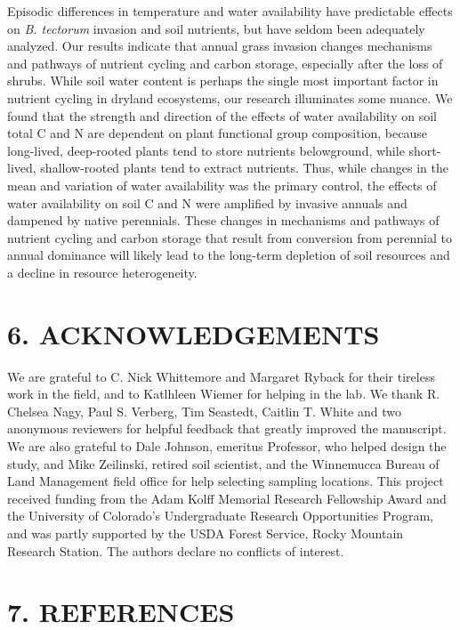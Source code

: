 \documentclass[
  11pt,
  a4paper,
]{article}
\begin{document}
Episodic differences in temperature and water availability have predictable effects on \emph{B. tectorum} invasion and soil nutrients, but have seldom been adequately analyzed. Our results indicate that annual grass invasion changes mechanisms and pathways of nutrient cycling and carbon storage, especially after the loss of shrubs. While soil water content is perhaps the single most important factor in nutrient cycling in dryland ecosystems, our research illuminates some nuance. We found that the strength and direction of the effects of water availability on soil total C and N are dependent on plant functional group composition, because long-lived, deep-rooted plants tend to store nutrients belowground, while short-lived, shallow-rooted plants tend to extract nutrients. Thus, while changes in the mean and variation of water availability was the primary control, the effects of water availability on soil C and N were amplified by invasive annuals and dampened by native perennials. These changes in mechanisms and pathways of nutrient cycling and carbon storage that result from conversion from perennial to annual dominance will likely lead to the long-term depletion of soil resources and a decline in resource heterogeneity.

\hypertarget{acknowledgements}{%
\section{6. ACKNOWLEDGEMENTS}\label{acknowledgements}}

We are grateful to C. Nick Whittemore and Margaret Ryback for their tireless work in the field, and to Katlhleen Wiemer for helping in the lab. We thank R. Chelsea Nagy, Paul S. Verberg, Tim Seastedt, Caitlin T. White and two anonymous reviewers for helpful feedback that greatly improved the manuscript. We are also grateful to Dale Johnson, emeritus Professor, who helped design the study, and Mike Zeilinski, retired soil scientist, and the Winnemucca Bureau of Land Management field office for help selecting sampling locations. This project received funding from the Adam Kolff Memorial Research Fellowship Award and the University of Colorado's Undergraduate Research Opportunities Program, and was partly supported by the USDA Forest Service, Rocky Mountain Research Station. The authors declare no conflicts of interest.

\hypertarget{references}{%
\section{7. REFERENCES}\label{references}}
\end{document}
